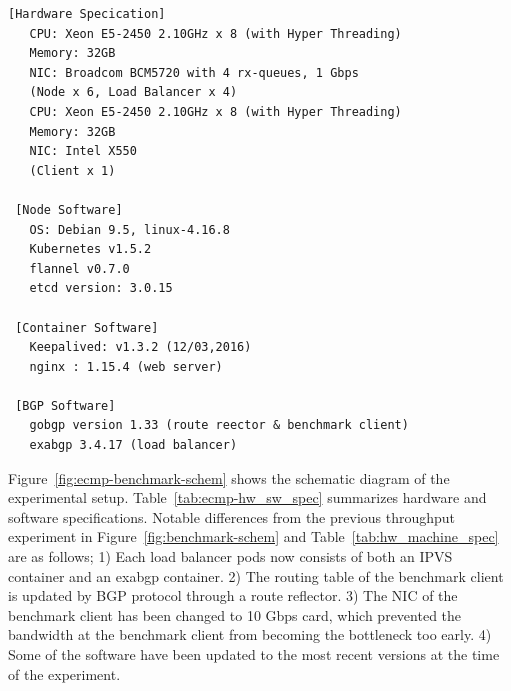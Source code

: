 \begin{table}[h]
  \centering
  \begin{minipage}{0.9\columnwidth}
    \begin{lstlisting}[frame=lines,breaklines=true,basicstyle=\small\ttfamily]
 [Hardware Specication]
   CPU: Xeon E5-2450 2.10GHz x 8 (with Hyper Threading)
   Memory: 32GB
   NIC: Broadcom BCM5720 with 4 rx-queues, 1 Gbps
   (Node x 6, Load Balancer x 4)
   CPU: Xeon E5-2450 2.10GHz x 8 (with Hyper Threading)
   Memory: 32GB
   NIC: Intel X550
   (Client x 1)

 [Node Software]
   OS: Debian 9.5, linux-4.16.8
   Kubernetes v1.5.2
   flannel v0.7.0
   etcd version: 3.0.15

 [Container Software]
   Keepalived: v1.3.2 (12/03,2016)
   nginx : 1.15.4 (web server)

 [BGP Software]
   gobgp version 1.33 (route reector & benchmark client)
   exabgp 3.4.17 (load balancer)
    \end{lstlisting}
  \end{minipage}

  \par\bigskip
  \centering
  \begin{minipage}{0.9\columnwidth}
    \caption[Hardware and software specifications for ECMP experiment]{
      Hardware and software specifications for ECMP experiment.
      The NIC of the benchmark client is 10 Gbps card to measure the aggregated throughput of 1Gbps load balancers.
    }
    \label{tab:ecmp-hw_sw_spec}
  \end{minipage}
\end{table}

Figure~\ref{fig:ecmp-benchmark-schem} shows the schematic diagram of the experimental setup. Table~\ref{tab:ecmp-hw_sw_spec} summarizes hardware and software specifications.
Notable differences from the previous throughput experiment in Figure~\ref{fig:benchmark-schem} and Table~\ref{tab:hw_machine_spec} are as follows;
1) Each load balancer pods now consists of both an IPVS container and an exabgp container.
2) The routing table of the benchmark client is updated by BGP protocol through a route reflector.
3) The NIC of the benchmark client has been changed to 10 Gbps card, which prevented the bandwidth at the benchmark client from becoming the bottleneck too early.
4) Some of the software have been updated to the most recent versions at the time of the experiment.

\FloatBarrier

